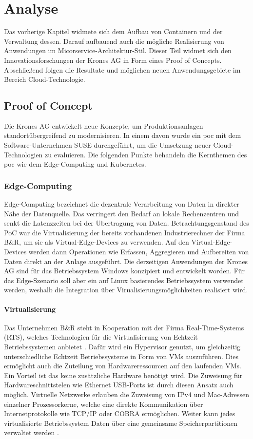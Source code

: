 \chapter{Analyse}\label{Analyse}

Das vorherige Kapitel widmete sich dem Aufbau von Containern und der Verwaltung dessen.
Darauf aufbauend auch die mögliche Realisierung von Anwendungen im Micorservice-Architektur-Stil. 
Dieser Teil widmet sich den Innovationsforschungen der Krones AG in Form eines Proof of Concepts.
Abschließend folgen die Resultate und möglichen neuen Anwendungsgebiete im Bereich Cloud-Technologie.


\section{Proof of Concept}\label{moderninfra}
Die Krones AG entwickelt neue Konzepte, um Produktionsanlagen standortübergreifend zu modernisieren. 
In einem davon wurde ein \ac{poc} mit dem Software-Unternehmen SUSE durchgeführt, um die Umsetzung neuer Cloud-Technologien zu evaluieren. 
Die folgenden Punkte behandeln die Kernthemen des \acs{poc} wie dem Edge-Computing und Kubernetes.

\subsection{Edge-Computing}
Edge-Computing bezeichnet die dezentrale Verarbeitung von Daten in direkter Nähe der Datenquelle. 
Das verringert den Bedarf an lokale Rechenzentren und senkt die Latenzzeiten bei der Übertragung von Daten. 
Betrachtungsgenstand des PoC war die Virtualisierung der bereits vorhandenen Industrierechner der Firma B\&R, um sie als Virtual-Edge-Devices zu verwenden.
Auf den Virtual-Edge-Devices werden dann Operationen wie Erfassen, Aggregieren und Aufbereiten von Daten direkt an der Anlage ausgeführt. 
Die derzeitigen Anwendungen der Krones AG sind für das Betriebssystem Windows konzipiert und entwickelt worden.
Für das Edge-Szenario soll aber ein auf Linux basierendes Betriebssystem verwendet werden,
weshalb die Integration über Virualisierungsmöglichkeiten realisiert wird.

\subsubsection{Virtualisierung}
Das Unternehmen B\&R steht in Kooperation mit der Firma Real-Time-Systems (RTS), welches Technologien für die Virtualisierung von Echtzeit Betriebssystemen anbietet \cite{rtosandbundr}.
Dafür wird ein Hypervisor genutzt, um gleichzeitig unterschiedliche Echtzeit Betriebssysteme in Form von VMs auszuführen.
Dies ermöglicht auch die Zuteilung von Hardwareressourcen auf den laufenden VMs.
Ein Vorteil ist das keine zusätzliche Hardware benötigt wird.
Die Zuweisung für Hardwareschnittstelen wie Ethernet USB-Ports ist durch diesen Ansatz auch möglich.
Virtuelle Netzwerke erlauben die Zuweisung von IPv4 und Mac-Adressen einzelner Prozessorkerne, welche
eine direkte Kommunikation über Internetprotokolle wie TCP/IP oder COBRA ermöglichen.
Weiter kann jedes virtualisierte Betriebssystem Daten über eine gemeinsame Speicherpartitionen verwaltet werden \cite{rtos}.

